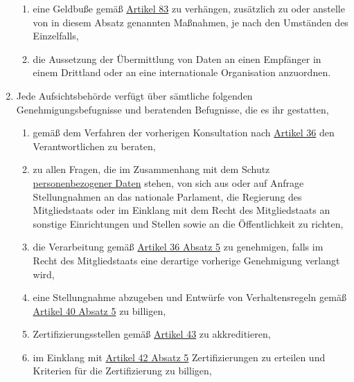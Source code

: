 \begin{enumerate}
\begin{enumerate}
    \item eine Geldbuße gemäß \hyperref[ch:83]{Artikel 83} zu verhängen, zusätzlich zu oder anstelle von in diesem
     Absatz genannten Maßnahmen, je nach den Umständen des Einzelfalls,
    \label{itm:58-2i}

    \item die Aussetzung der Übermittlung von Daten an einen Empfänger in einem Drittland oder an eine internationale
     Organisation anzuordnen.
    \label{itm:58-2j}

  \end{enumerate}

  \item Jede Aufsichtsbehörde verfügt über sämtliche folgenden Genehmigungsbefugnisse und beratenden Befugnisse, die es
   ihr gestatten,
  \label{itm:58-3}

  \begin{enumerate}
  
    \item gemäß dem Verfahren der vorherigen Konsultation nach \hyperref[ch:36]{Artikel 36} den Verantwortlichen zu
     beraten,
    \label{itm:58-3a}

    \item zu allen Fragen, die im Zusammenhang mit dem Schutz \hyperref[itm:04-1]{personenbezogener Daten} stehen, von sich aus oder auf
     Anfrage Stellungnahmen an das nationale Parlament, die Regierung des Mitgliedstaats oder im Einklang mit dem Recht
     des Mitgliedstaats an sonstige Einrichtungen und Stellen sowie an die Öffentlichkeit zu richten,
    \label{itm:58-3b}

    \item die Verarbeitung gemäß \hyperref[itm:36-5]{Artikel 36 Absatz 5} zu genehmigen, falls im Recht des
     Mitgliedstaats eine derartige vorherige Genehmigung verlangt wird,
    \label{itm:58-3c}

    \item eine Stellungnahme abzugeben und Entwürfe von Verhaltensregeln gemäß \hyperref[itm:40-5]{Artikel 40 Absatz 5}
     zu billigen,
    \label{itm:58-3d}

    \item Zertifizierungsstellen gemäß \hyperref[ch:43]{Artikel 43} zu akkreditieren,
    \label{itm:58-3e}

    \item im Einklang mit \hyperref[itm:42-5]{Artikel 42 Absatz 5} Zertifizierungen zu erteilen und Kriterien für die
     Zertifizierung zu billigen,
    \label{itm:58-3f}


\end{enumerate}
\end{enumerate}
